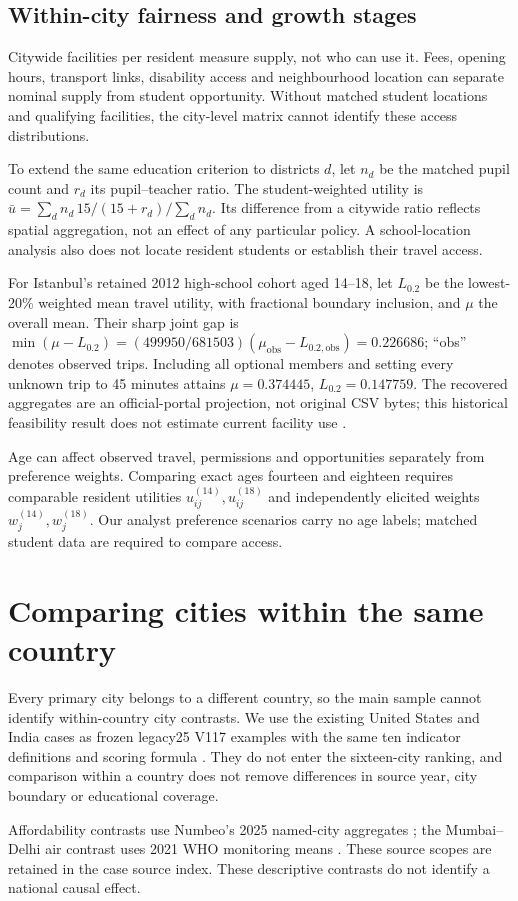 \subsection{Within-city fairness and growth stages}
Citywide facilities per resident measure supply, not who can use it. Fees,
opening hours, transport links, disability access and neighbourhood location
can separate nominal supply from student opportunity. Without matched student
locations and qualifying facilities, the city-level matrix cannot identify
these access distributions.

\EquityCase
To extend the same education criterion to districts $d$, let $n_d$ be the
matched pupil count and $r_d$ its pupil--teacher ratio. The student-weighted
utility is $\bar u=\sum_d n_d\,15/(15+r_d)/\sum_dn_d$.
Its difference from a citywide ratio reflects spatial aggregation, not an
effect of any particular policy. A school-location analysis also does not locate
resident students or establish their travel access.

For Istanbul's retained 2012 high-school cohort aged 14--18, let $L_{0.2}$ be
the lowest-20\% weighted mean travel utility, with fractional boundary inclusion,
and $\mu$ the overall mean. Their sharp joint gap is
$\min(\mu-L_{0.2})=(499950/681503)(\mu_{\mathrm{obs}}-L_{0.2,\mathrm{obs}})=0.226686$;
``obs'' denotes observed trips. Including all optional members and setting every
unknown trip to 45 minutes attains $\mu=0.374445$, $L_{0.2}=0.147759$.
The recovered aggregates are an official-portal projection, not original CSV
bytes; this historical feasibility result does not estimate current facility
use \cite{istanbul}.

\AgeCase



Age can affect observed travel, permissions and opportunities separately from preference weights. Comparing exact ages fourteen and eighteen requires comparable resident utilities $u_{ij}^{(14)},u_{ij}^{(18)}$ and independently elicited weights $w_j^{(14)},w_j^{(18)}$. Our analyst preference scenarios carry no age labels; matched student data are required to compare access.

\clearpage
\section{Comparing cities within the same country}
Every primary city belongs to a different country, so the main sample cannot
identify within-country city contrasts. We use the existing United States and
India cases as frozen legacy25 V117 examples with the same ten indicator
definitions and scoring formula \cite{legacycase}. They do not enter the sixteen-city ranking,
and comparison within a country does not remove differences in source year,
city boundary or educational coverage.



\CountryInterpretation
Affordability contrasts use Numbeo's 2025 named-city aggregates
\cite{numbeocase}; the Mumbai--Delhi air contrast uses 2021 WHO monitoring
means \cite{whocase}. These source scopes are retained in the case source index.
These descriptive contrasts do not identify a national causal effect.
